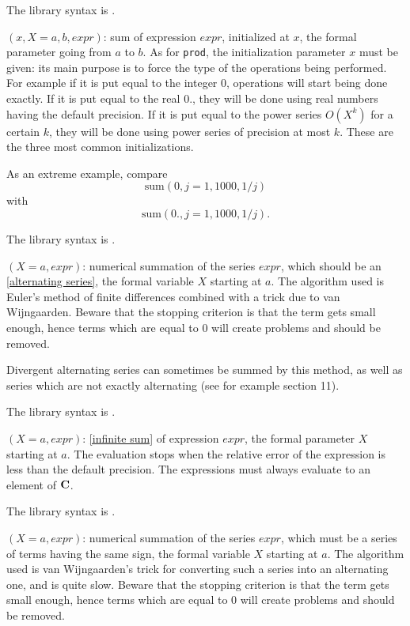 The library syntax is .

$(x,X=a,b,expr)$: sum of expression $expr$, initialized at
$x$, the formal parameter going from $a$ to $b$. As for {\tt prod}, the
initialization parameter $x$ must be given: its main purpose is to force
the type of the operations being performed. For example if it is put equal
to the integer 0, operations will start being done exactly. If it is put
equal to the real $0.$, they will be done using real numbers having the
default
precision. If it is put equal to the power series $O(X^k)$ for a certain
$k$, they will be done using power series of precision at most $k$. These
are the three most common initializations.

As an extreme example, compare $$\text{sum}(0,j=1, 1000, 1/j)$$
with  $$\text{sum}(0.,j=1, 1000, 1/j ).$$

The library syntax is .

$(X=a, expr)$: numerical summation of the series $expr$,
which should be an \ref{alternating series}, the formal variable $X$ 
starting at $a$. The algorithm used is Euler's method of finite differences
combined with a trick due to van Wijngaarden.
Beware that the stopping criterion is that the term gets small enough, hence
terms which are equal to 0 will create problems and should be removed.

Divergent alternating series can sometimes be summed by this method, as well as
series which are not exactly alternating (see for example section 11).

The library syntax is .

$(X=a,expr)$: \ref{infinite sum} of expression $expr$, the 
formal parameter $X$ starting at $a$. The evaluation stops when the relative
error of the expression is less than the default precision. The expressions
must always evaluate to an element of $\Bbb C$.

The library syntax is .

$(X=a,expr)$: numerical summation of the series $expr$,
which must be a series of terms having the same sign, the formal variable $X$
starting at $a$. The algorithm used is van Wijngaarden's
trick for converting such a series into an alternating one, and is quite slow.
Beware that the stopping criterion is that the term gets small enough, hence
terms which are equal to 0 will create problems and should be removed.

